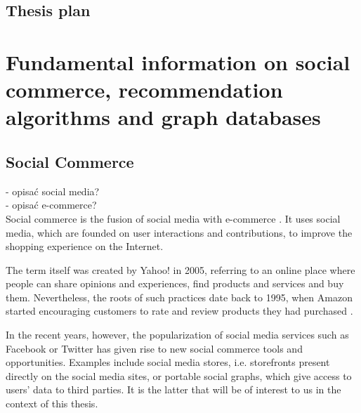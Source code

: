 \documentclass[12pt]{report}
\begin{document}
\section{Thesis plan}





\chapter[Fundamental information on social...]{Fundamental information on social commerce, recommendation algorithms and graph databases} \label{fundamental_info}

\section{Social Commerce}

- opisać social media?\\
- opisać e-commerce?\\

Social commerce is the fusion of social media with e-commerce \cite{social_commerce_syzygy}. It uses social media, which are founded on user interactions and contributions, to improve the shopping experience on the Internet.

The term itself was created by Yahoo! in 2005, referring to an online place where people can share opinions and experiences, find products and services and buy them. Nevertheless, the roots of such practices date back to 1995, when Amazon started encouraging customers to rate and review products they had purchased \cite{social_commerce_syzygy}.

In the recent years, however, the popularization of social media services such as Facebook or Twitter has given rise to new social commerce tools and opportunities. Examples include social media stores, i.e. storefronts present directly on the social media sites, or portable social graphs, which give access to users' data to third parties. It is the latter that will be of interest to us in the context of this thesis.
\end{document}

